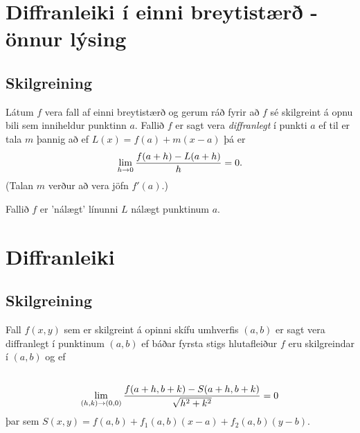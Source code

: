 \documentclass[a4paper,10pt,icelandic]{sphinxmanual}
\begin{document}

\section{Diffranleiki í einni breytistærð - önnur lýsing}
\label{Kafli2:diffranleiki-i-einni-breytistaer-onnur-lysing}\label{Kafli2:index-14}

\subsection{Skilgreining}
\label{Kafli2:id27}
Látum \(f\) vera fall af einni breytistærð og gerum ráð fyrir að
\(f\) sé skilgreint á opnu bili sem inniheldur punktinn \(a\).
Fallið \(f\) er sagt vera \emph{diffranlegt} í punkti \(a\) ef til er
tala \(m\) þannig að ef \(L(x)=f(a)+m(x-a)\) þá er
\begin{gather}
\begin{split}\displaystyle \lim_{h\rightarrow 0}\frac{f(a+h)-L(a+h)}{h}=0.\end{split}\notag
\end{gather}
(Talan \(m\) verður að vera jöfn \(f'(a)\).)

Fallið \(f\) er ’nálægt’ línunni \(L\) nálægt punktinum
\(a\).


\section{Diffranleiki}
\label{Kafli2:diffranleiki}

\subsection{Skilgreining}
\label{Kafli2:id28}\label{Kafli2:index-15}
Fall \(f(x,y)\) sem er skilgreint á opinni skífu umhverfis
\((a,b)\) er sagt vera diffranlegt í punktinum \((a,b)\) ef
báðar fyrsta stigs hlutafleiður \(f\) eru skilgreindar í
\((a,b)\) og ef
\begin{gather}
\begin{split}\displaystyle\end{split}\notag\\\begin{split}\lim_{(h,k)\rightarrow (0,0)}
\frac{f(a+h, b+k)-S(a+h,b+k)}{\sqrt{h^2+k^2}}=0\end{split}\notag
\end{gather}
þar sem \(S(x,y) = f(a,b) + f_1(a,b)(x-a)+f_2(a,b)(y-b)\).
\end{document}
